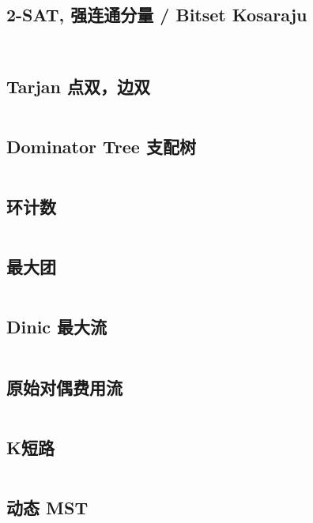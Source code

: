 				\subsection{2-SAT, 强连通分量 / Bitset Kosaraju}
					\inputminted{cpp}{sections/GraphTheory/assets/graph/2-sat.cpp}
					\inputminted{cpp}{sections/GraphTheory/assets/graph/kosaraju.cpp}
				\subsection{Tarjan 点双，边双}
					\inputminted{cpp}{sections/GraphTheory/assets/graph/Tarjan.cpp}
				\subsection{Dominator Tree 支配树}
					\inputminted{cpp}{sections/GraphTheory/assets/graph/支配树.cpp}
				\subsection{环计数}
					\inputminted{cpp}{sections/GraphTheory/assets/graph/环计数.cpp}
				\subsection{最大团}
					\inputminted{cpp}{sections/GraphTheory/assets/graph/MaximumClique.cpp}
				\subsection{Dinic 最大流}
					
					\inputminted[highlightlines={8,30}]{cpp}{sections/GraphTheory/assets/graph/Dinic.cpp}
				\subsection{原始对偶费用流}
					\inputminted[highlightlines={50}]{cpp}{sections/GraphTheory/assets/graph/原始对偶费用流.cpp}
				\subsection{K短路}
					\inputminted{cpp}{sections/GraphTheory/assets/graph/K短路.cpp}
				\subsection{动态 MST}
					\inputminted{cpp}{sections/GraphTheory/assets/graph/DynamicMST.cpp}
